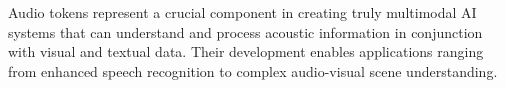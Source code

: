 \begin{comment}
\begin{enumerate}
\item \textbf{Feature Diversity}: Start with log-Mel spectrograms as a strong, general-purpose feature. If your task involves music, consider adding features like chroma or pitch to provide more relevant information to the model
\item \textbf{Temporal Alignment}: When working with video, be aware of potential audio-visual desynchronization in your dataset. A common preprocessing step is to use a tool like FFmpeg to verify and correct the alignment between audio and video streams
\item \textbf{Noise Robustness}: Incorporate audio-specific data augmentation during training. Libraries like \texttt{audiomentations} can add background noise, reverberation, and pitch shifts, which can significantly improve the model's real-world performance
\item \textbf{Scale Invariance}: Handle audio of different durations and sampling rates
\item \textbf{Domain Adaptation}: Fine-tune for specific audio domains (speech, music, environmental)
\item \textbf{Efficient Processing}: Optimize for real-time applications when required
\item \textbf{Cross-Modal Validation}: Evaluate performance on multimodal tasks
\item \textbf{Interpretability}: Monitor attention patterns between audio and other modalities
\end{enumerate}
\begin{comment}
Feedback: This is a great list. To make it more actionable:
1.  **Feature Diversity**: "Start with log-Mel spectrograms as a strong, general-purpose feature. If your task involves music, consider adding features like chroma or pitch to provide more relevant information to the model."
2.  **Temporal Alignment**: "When working with video, be aware of potential audio-visual desynchronization in your dataset. A common preprocessing step is to use a tool like FFmpeg to verify and correct the alignment between audio and video streams."
3.  **Noise Robustness**: "Incorporate audio-specific data augmentation during training. Libraries like `audiomentations` can add background noise, reverberation, and pitch shifts, which can significantly improve the model's real-world performance."

STATUS: addressed - enhanced the three key recommendations with specific, actionable guidance
\end{comment}

Audio tokens represent a crucial component in creating truly multimodal AI systems that can understand and process acoustic information in conjunction with visual and textual data. Their development enables applications ranging from enhanced speech recognition to complex audio-visual scene understanding.
